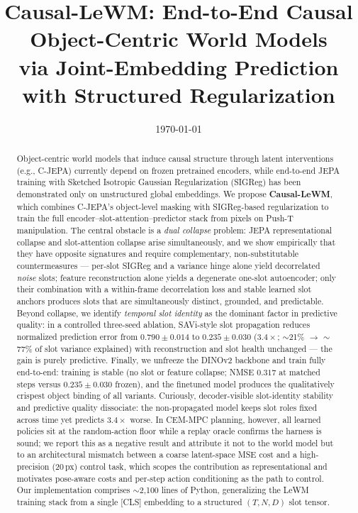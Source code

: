 \documentclass[12pt]{article}
\title{\vspace{-2em}\textbf{Causal-LeWM: End-to-End Causal Object-Centric World Models\\ via Joint-Embedding Prediction with Structured Regularization}\vspace{-1em}}
\author{
}
\date{\today}
\begin{document}
\maketitle

\begin{abstract}
Object-centric world models that induce causal structure through latent interventions (e.g., C-JEPA) currently depend on frozen pretrained encoders, while end-to-end JEPA training with Sketched Isotropic Gaussian Regularization (SIGReg) has been demonstrated only on unstructured global embeddings. We propose \textbf{Causal-LeWM}, which combines C-JEPA's object-level masking with SIGReg-based regularization to train the full encoder--slot-attention--predictor stack from pixels on Push-T manipulation. The central obstacle is a \emph{dual collapse} problem: JEPA representational collapse and slot-attention collapse arise simultaneously, and we show empirically that they have opposite signatures and require complementary, non-substitutable countermeasures --- per-slot SIGReg and a variance hinge alone yield decorrelated \emph{noise} slots; feature reconstruction alone yields a degenerate one-slot autoencoder; only their combination with a within-frame decorrelation loss and stable learned slot anchors produces slots that are simultaneously distinct, grounded, and predictable. Beyond collapse, we identify \emph{temporal slot identity} as the dominant factor in predictive quality: in a controlled three-seed ablation, SAVi-style slot propagation reduces normalized prediction error from $0.790 \pm 0.014$ to $0.235 \pm 0.030$ ($3.4\times$; $\sim$21\% $\rightarrow$ $\sim$77\% of slot variance explained) with reconstruction and slot health unchanged --- the gain is purely predictive. Finally, we unfreeze the DINOv2 backbone and train fully end-to-end: training is stable (no slot or feature collapse; NMSE $0.317$ at matched steps versus $0.235 \pm 0.030$ frozen), and the finetuned model produces the qualitatively crispest object binding of all variants. Curiously, decoder-visible slot-identity stability and predictive quality dissociate: the non-propagated model keeps slot roles fixed across time yet predicts $3.4\times$ worse. In CEM-MPC planning, however, all learned policies sit at the random-action floor while a replay oracle confirms the harness is sound; we report this as a negative result and attribute it not to the world model but to an architectural mismatch between a coarse latent-space MSE cost and a high-precision ($20$\,px) control task, which scopes the contribution as representational and motivates pose-aware costs and per-step action conditioning as the path to control. Our implementation comprises $\sim$2{,}100 lines of Python, generalizing the LeWM training stack from a single [CLS] embedding to a structured $(T, N, D)$ slot tensor.
\end{abstract}
\end{document}
